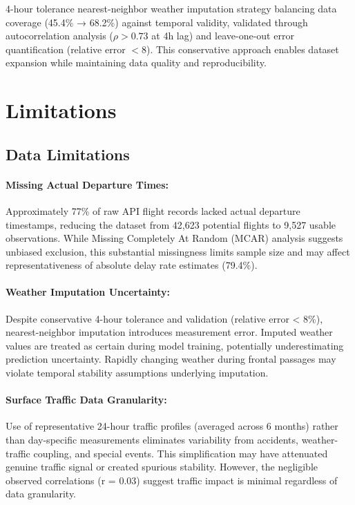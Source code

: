 \documentclass{report}
\begin{document}
4-hour tolerance nearest-neighbor weather imputation strategy balancing data coverage (45.4\% → 68.2\%) against temporal validity, validated through autocorrelation analysis ($\rho > 0.73$ at 4h lag) and leave-one-out error quantification (relative error $< 8$). This conservative approach enables dataset expansion while maintaining data quality and reproducibility.

\section{Limitations}
\label{sec:limitations}

\subsection{Data Limitations}

\paragraph{Missing Actual Departure Times:} Approximately 77\% of raw API flight records lacked actual departure timestamps, reducing the dataset from 42,623 potential flights to 9,527 usable observations. While Missing Completely At Random (MCAR) analysis suggests unbiased exclusion, this substantial missingness limits sample size and may affect representativeness of absolute delay rate estimates (79.4\%).

\paragraph{Weather Imputation Uncertainty:} Despite conservative 4-hour tolerance and validation (relative error < 8\%), nearest-neighbor imputation introduces measurement error. Imputed weather values are treated as certain during model training, potentially underestimating prediction uncertainty. Rapidly changing weather during frontal passages may violate temporal stability assumptions underlying imputation.

\paragraph{Surface Traffic Data Granularity:} Use of representative 24-hour traffic profiles (averaged across 6 months) rather than day-specific measurements eliminates variability from accidents, weather-traffic coupling, and special events. This simplification may have attenuated genuine traffic signal or created spurious stability. However, the negligible observed correlations (r = 0.03) suggest traffic impact is minimal regardless of data granularity.
\end{document}
